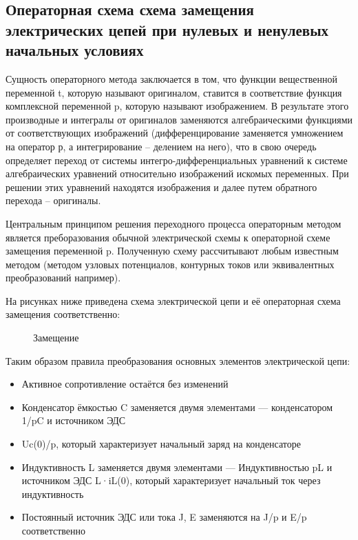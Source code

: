 \subsection{Операторная схема схема замещения электрических цепей при нулевых и ненулевых начальных условиях}

Сущность операторного метода заключается в том, что функции вещественной переменной t, которую называют оригиналом, ставится в соответствие функция комплексной переменной p, которую называют изображением. В результате этого производные и интегралы от оригиналов заменяются алгебраическими функциями от соответствующих изображений (дифференцирование заменяется умножением на оператор р, а интегрирование – делением на него), что в свою очередь определяет переход от системы интегро-дифференциальных уравнений к системе алгебраических уравнений относительно изображений искомых переменных. При решении этих уравнений находятся изображения и далее путем обратного перехода – оригиналы.

Центральным принципом решения переходного процесса операторным методом является преборазования обычной электрической схемы к операторной схеме замещения переменной p. Полученную схему рассчитывают любым известным методом (методом узловых потенциалов, контурных токов или эквивалентных преобразований например).

На рисунках ниже приведена схема электрической цепи и её операторная схема замещения соответственно:

\begin{center}
  \begin{figure}[h!]	
    \caption{Замещение}  
  \end{figure}
\end{center}

Таким образом правила преобразования основных элементов электрической цепи:

\begin{itemize}
\item Активное сопротивление остаётся без изменений
\item Конденсатор ёмкостью C заменяется двумя элементами — конденсатором 1/pC и источником ЭДС \item Uc(0)/p, который характеризует начальный заряд на конденсаторе
\item Индуктивность L заменяется двумя элементами — Индуктивностью pL и источником ЭДС L·iL(0), который характеризует начальный ток через индуктивность
\item Постоянный источник ЭДС или тока J, E заменяются на J/p и E/p соответственно
\end{itemize}

\pagebreak
